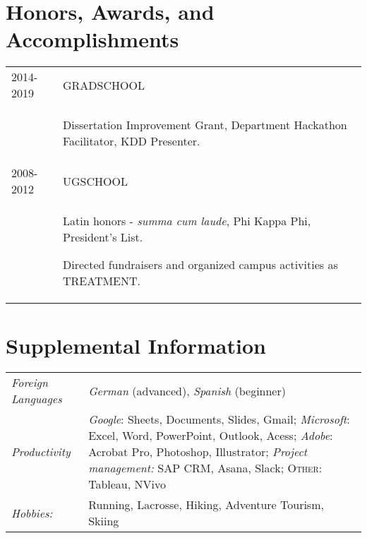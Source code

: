 \documentclass[a4paper,10pt]{article}
\begin{document}
\section{Honors, Awards, and Accomplishments}
\begin{supertabular}{p{3.4cm} p{13.9cm}}

	\textsc{2014-2019} 				& \textsc{GRADSCHOOL} \\
														& \begin{enumerate*}[label =$\circ$, itemjoin={\newline}]
																\item \footnotesize Dissertation Improvement Grant, Department Hackathon Facilitator, KDD Presenter.
																\end{enumerate*} \vspace{2mm} \\

	\textsc{2008-2012} 				& \textsc{UGSCHOOL} \\
														& \begin{enumerate*}[label =$\circ$, itemjoin={\newline}]
																\item \footnotesize  Latin honors - \emph{summa cum laude}, Phi Kappa Phi, President's List.
																\item \footnotesize  Directed fundraisers and organized campus activities as TREATMENT.
																\end{enumerate*} \vspace{2mm} \\



\end{supertabular}



\section{Supplemental Information}
\begin{supertabular}{p{3.4cm} p{13.9cm}}
	\emph{Foreign Languages}			& \small \emph{German} (advanced), \emph{Spanish} (beginner) \vspace{1mm} \\

	\emph{Productivity}					& \small\emph{Google}: \footnotesize Sheets, Documents, Slides, Gmail; \small\emph{Microsoft}: \footnotesize Excel, Word, PowerPoint, Outlook, Acess;	\small\emph{Adobe}: \footnotesize Acrobat Pro, Photoshop, Illustrator; \small\emph{Project management:} \footnotesize SAP CRM, Asana, Slack; \small\textsc{Other:} \footnotesize Tableau, NVivo \vspace{1mm} \\
	\emph{Hobbies:} 		& \small Running, Lacrosse, Hiking, Adventure Tourism, Skiing \\

\end{supertabular}
\end{document}
